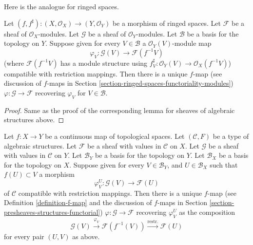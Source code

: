 \noindent
Here is the analogue for ringed spaces.

\begin{lemma}
\label{lemma-f-map-basis-below-modules}
Let $(f, f^\sharp) : (X, \mathcal{O}_X) \to (Y, \mathcal{O}_Y)$
be a morphism of ringed spaces.
Let $\mathcal{F}$ be a sheaf of $\mathcal{O}_X$-modules.
Let $\mathcal{G}$ be a sheaf of $\mathcal{O}_Y$-modules.
Let $\mathcal{B}$ be a basis for the topology on $Y$.
Suppose given for every $V \in \mathcal{B}$ a
$\mathcal{O}_Y(V)$-module map
$$
\varphi_V :
\mathcal{G}(V)
\longrightarrow
\mathcal{F}(f^{-1}V)
$$
(where $\mathcal{F}(f^{-1}V)$ has a module structure using
$f^\sharp_V : \mathcal{O}_Y(V) \to \mathcal{O}_X(f^{-1}V)$)
compatible with restriction mappings.
Then there is a unique $f$-map (see discussion of $f$-maps in
Section \ref{section-ringed-spaces-functoriality-modules})
$\varphi : \mathcal{G} \to \mathcal{F}$
recovering $\varphi_V$ for $V \in \mathcal{B}$.
\end{lemma}

\begin{proof}
Same as the proof of the corresponding lemma
for sheaves of algebraic structures above.
\end{proof}

\begin{lemma}
\label{lemma-f-map-basis-above-and-below-structures}
Let $f : X \to Y$ be a continuous map of topological spaces.
Let $(\mathcal{C}, F)$ be a type of algebraic structures.
Let $\mathcal{F}$ be a sheaf with values in $\mathcal{C}$ on $X$.
Let $\mathcal{G}$ be a sheaf with values in $\mathcal{C}$ on $Y$.
Let $\mathcal{B}_Y$ be a basis for the topology on $Y$.
Let $\mathcal{B}_X$ be a basis for the topology on $X$.
Suppose given for every $V \in \mathcal{B}_Y$, and
$U \in \mathcal{B}_X$ such that $f(U) \subset V$ a morphism
$$
\varphi_V^U :
\mathcal{G}(V)
\longrightarrow
\mathcal{F}(U)
$$
of $\mathcal{C}$ compatible with restriction mappings.
Then there is a unique $f$-map (see
Definition \ref{definition-f-map} and the discussion
of $f$-maps in Section \ref{section-presheaves-structures-functorial})
$\varphi : \mathcal{G} \to \mathcal{F}$
recovering $\varphi_V^U$ as the composition
$$
\mathcal{G}(V) \xrightarrow{\varphi_V}
\mathcal{F}(f^{-1}(V)) \xrightarrow{\text{restr.}}
\mathcal{F}(U)
$$
for every pair $(U, V)$ as above.
\end{lemma}

